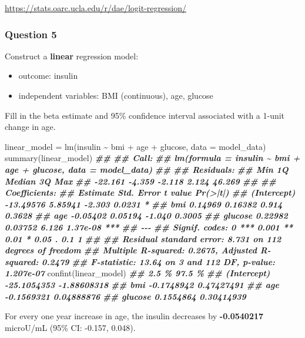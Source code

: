 \documentclass[
]{article}
\newenvironment{Shaded}{\begin{snugshade}}{\end{snugshade}}
\newcommand{\AttributeTok}[1]{\textcolor[rgb]{0.77,0.63,0.00}{#1}}
\newcommand{\DocumentationTok}[1]{\textcolor[rgb]{0.56,0.35,0.01}{\textbf{\textit{#1}}}}
\newcommand{\FunctionTok}[1]{\textcolor[rgb]{0.00,0.00,0.00}{#1}}
\newcommand{\NormalTok}[1]{#1}
\newcommand{\OtherTok}[1]{\textcolor[rgb]{0.56,0.35,0.01}{#1}}
\newcommand{\SpecialCharTok}[1]{\textcolor[rgb]{0.00,0.00,0.00}{#1}}
\providecommand{\tightlist}{%
  \setlength{\itemsep}{0pt}\setlength{\parskip}{0pt}}
\begin{document}
\url{https://stats.oarc.ucla.edu/r/dae/logit-regression/}

\hypertarget{question-5}{%
\subsubsection{Question 5}\label{question-5}}

Construct a \textbf{linear} regression model:

\begin{itemize}
\tightlist
\item
  outcome: insulin\\
\item
  independent variables: BMI (continuous), age, glucose
\end{itemize}

Fill in the beta estimate and 95\% confidence interval associated with a
1-unit change in age.

\begin{Shaded}
\begin{Highlighting}[]
\NormalTok{linear\_model }\OtherTok{=} \FunctionTok{lm}\NormalTok{(insulin }\SpecialCharTok{\textasciitilde{}}\NormalTok{ bmi }\SpecialCharTok{+}\NormalTok{ age }\SpecialCharTok{+}\NormalTok{ glucose, }\AttributeTok{data =}\NormalTok{ model\_data)}
\FunctionTok{summary}\NormalTok{(linear\_model)}
\DocumentationTok{\#\# }
\DocumentationTok{\#\# Call:}
\DocumentationTok{\#\# lm(formula = insulin \textasciitilde{} bmi + age + glucose, data = model\_data)}
\DocumentationTok{\#\# }
\DocumentationTok{\#\# Residuals:}
\DocumentationTok{\#\#     Min      1Q  Median      3Q     Max }
\DocumentationTok{\#\# {-}22.161  {-}4.359  {-}2.118   2.124  46.269 }
\DocumentationTok{\#\# }
\DocumentationTok{\#\# Coefficients:}
\DocumentationTok{\#\#              Estimate Std. Error t value Pr(\textgreater{}|t|)    }
\DocumentationTok{\#\# (Intercept) {-}13.49576    5.85941  {-}2.303   0.0231 *  }
\DocumentationTok{\#\# bmi           0.14969    0.16382   0.914   0.3628    }
\DocumentationTok{\#\# age          {-}0.05402    0.05194  {-}1.040   0.3005    }
\DocumentationTok{\#\# glucose       0.22982    0.03752   6.126 1.37e{-}08 ***}
\DocumentationTok{\#\# {-}{-}{-}}
\DocumentationTok{\#\# Signif. codes:  0 \textquotesingle{}***\textquotesingle{} 0.001 \textquotesingle{}**\textquotesingle{} 0.01 \textquotesingle{}*\textquotesingle{} 0.05 \textquotesingle{}.\textquotesingle{} 0.1 \textquotesingle{} \textquotesingle{} 1}
\DocumentationTok{\#\# }
\DocumentationTok{\#\# Residual standard error: 8.731 on 112 degrees of freedom}
\DocumentationTok{\#\# Multiple R{-}squared:  0.2675, Adjusted R{-}squared:  0.2479 }
\DocumentationTok{\#\# F{-}statistic: 13.64 on 3 and 112 DF,  p{-}value: 1.207e{-}07}
\FunctionTok{confint}\NormalTok{(linear\_model)}
\DocumentationTok{\#\#                   2.5 \%      97.5 \%}
\DocumentationTok{\#\# (Intercept) {-}25.1054353 {-}1.88608318}
\DocumentationTok{\#\# bmi          {-}0.1748942  0.47427491}
\DocumentationTok{\#\# age          {-}0.1569321  0.04888876}
\DocumentationTok{\#\# glucose       0.1554864  0.30414939}
\end{Highlighting}
\end{Shaded}

For every one year increase in age, the insulin decreases by
\textbf{-0.0540217} microU/mL (95\% CI: -0.157, 0.048).
\end{document}
